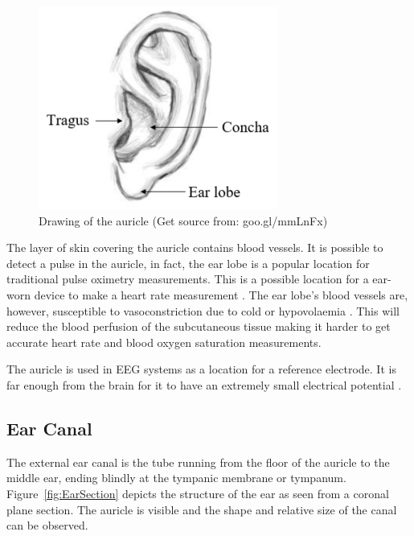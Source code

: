 \begin{figure}
   \centering
   \includegraphics[scale=1]{figs/AuricleLabel}
   \caption{Drawing of the auricle (Get source from: goo.gl/mmLnFx)}
   \label{fig:AuricleLabel}
\end{figure}

The layer of skin covering the auricle contains blood vessels. It is possible to detect a pulse in the auricle, in fact, the ear lobe is a popular location for traditional pulse oximetry measurements. This is a possible location for a ear-worn device to make a heart rate measurement \citep{poh2010motion}. The ear lobe's blood vessels are, however, susceptible to vasoconstriction due to cold or hypovolaemia \citep{WHO2011UsingPulseOxi}. This will reduce the blood perfusion of the subcutaneous tissue making it harder to get accurate heart rate and blood oxygen saturation measurements.

\medskip

The auricle is used in EEG systems as a location for a reference electrode. It is far enough from the brain for it to have an extremely small electrical potential \citep{nunez2006electric}.

\subsection{Ear Canal}
The external ear canal is the tube running from the floor of the auricle to the middle ear, ending blindly at the tympanic membrane or tympanum. Figure~\ref{fig:EarSection} depicts the structure of the ear as seen from a coronal plane section. The auricle is visible and the shape and relative size of the canal can be observed.

\medskip

